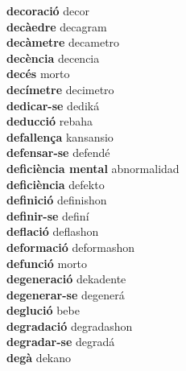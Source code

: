 \textbf{ decoració  } decor \\
\textbf{ decàedre  } decagram \\
\textbf{ decàmetre  } decametro \\
\textbf{ decència  } decencia \\
\textbf{ decés  } morto \\
\textbf{ decímetre  } decimetro \\
\textbf{ dedicar-se  } dediká \\
\textbf{ deducció  } rebaha \\
\textbf{ defallença  } kansansio \\
\textbf{ defensar-se  } defendé \\
\textbf{ deficiència mental  } abnormalidad \\
\textbf{ deficiència  } defekto \\
\textbf{ definició  } definishon \\
\textbf{ definir-se  } definí \\
\textbf{ deflació  } deflashon \\
\textbf{ deformació  } deformashon \\
\textbf{ defunció  } morto \\
\textbf{ degeneració  } dekadente \\
\textbf{ degenerar-se  } degenerá \\
\textbf{ deglució  } bebe \\
\textbf{ degradació  } degradashon \\
\textbf{ degradar-se  } degradá \\
\textbf{ degà  } dekano \\
